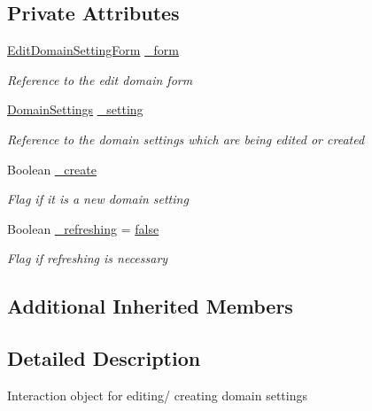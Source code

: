 \subsection*{Private Attributes}
\begin{DoxyCompactItemize}
\item 
\hyperlink{class_web_analyzer_1_1_u_i_1_1_edit_domain_setting_form}{Edit\+Domain\+Setting\+Form} \hyperlink{class_web_analyzer_1_1_u_i_1_1_interaction_objects_1_1_domain_setting_control_ac5d9f6410b6d83ed5f01dd3f9a23f8b4}{\+\_\+form}
\begin{DoxyCompactList}\small\item\em Reference to the edit domain form \end{DoxyCompactList}\item 
\hyperlink{class_web_analyzer_1_1_models_1_1_settings_model_1_1_domain_settings}{Domain\+Settings} \hyperlink{class_web_analyzer_1_1_u_i_1_1_interaction_objects_1_1_domain_setting_control_a3c559717deaa9cbc0575bd3a0407edbc}{\+\_\+setting}
\begin{DoxyCompactList}\small\item\em Reference to the domain settings which are being edited or created \end{DoxyCompactList}\item 
Boolean \hyperlink{class_web_analyzer_1_1_u_i_1_1_interaction_objects_1_1_domain_setting_control_af65a88bba8daa8c7ff8fd80e6f46d3bc}{\+\_\+create}
\begin{DoxyCompactList}\small\item\em Flag if it is a new domain setting \end{DoxyCompactList}\item 
Boolean \hyperlink{class_web_analyzer_1_1_u_i_1_1_interaction_objects_1_1_domain_setting_control_a7a9d3a672767f8e4e7e81c3ad8948879}{\+\_\+refreshing} = \hyperlink{_u_i_2_h_t_m_l_resources_2js_2src_2export_8js_ae6c865df784842196d411c1466b01686}{false}
\begin{DoxyCompactList}\small\item\em Flag if refreshing is necessary \end{DoxyCompactList}\end{DoxyCompactItemize}
\subsection*{Additional Inherited Members}


\subsection{Detailed Description}
Interaction object for editing/ creating domain settings 



